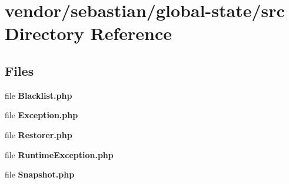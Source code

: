 \section{vendor/sebastian/global-\/state/src Directory Reference}
\label{dir_3acb707c4fe57882dbb7242bbace5177}
\subsection*{Files}
\begin{DoxyCompactItemize}
\item 
file {\bf Blacklist.\+php}
\item 
file {\bf Exception.\+php}
\item 
file {\bf Restorer.\+php}
\item 
file {\bf Runtime\+Exception.\+php}
\item 
file {\bf Snapshot.\+php}
\end{DoxyCompactItemize}
